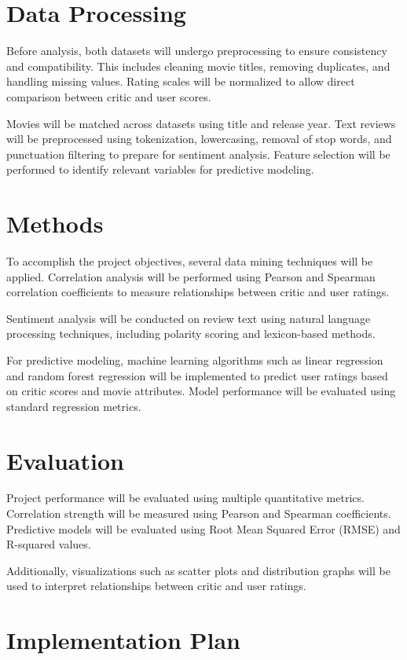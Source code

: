 \documentclass[conference]{IEEEtran}
\begin{document}
\section{Data Processing}

Before analysis, both datasets will undergo preprocessing to ensure
consistency and compatibility. This includes cleaning movie titles,
removing duplicates, and handling missing values. Rating scales will
be normalized to allow direct comparison between critic and user scores.

Movies will be matched across datasets using title and release year.
Text reviews will be preprocessed using tokenization, lowercasing,
removal of stop words, and punctuation filtering to prepare for
sentiment analysis. Feature selection will be performed to identify
relevant variables for predictive modeling.

\section{Methods}

To accomplish the project objectives, several data mining techniques
will be applied. Correlation analysis will be performed using Pearson
and Spearman correlation coefficients to measure relationships between
critic and user ratings.

Sentiment analysis will be conducted on review text using natural
language processing techniques, including polarity scoring and
lexicon-based methods.

For predictive modeling, machine learning algorithms such as linear
regression and random forest regression will be implemented to predict
user ratings based on critic scores and movie attributes. Model
performance will be evaluated using standard regression metrics.

\section{Evaluation}

Project performance will be evaluated using multiple quantitative
metrics. Correlation strength will be measured using Pearson and
Spearman coefficients. Predictive models will be evaluated using
Root Mean Squared Error (RMSE) and R-squared values.

Additionally, visualizations such as scatter plots and distribution
graphs will be used to interpret relationships between critic and
user ratings.

\section{Implementation Plan}
\end{document}
